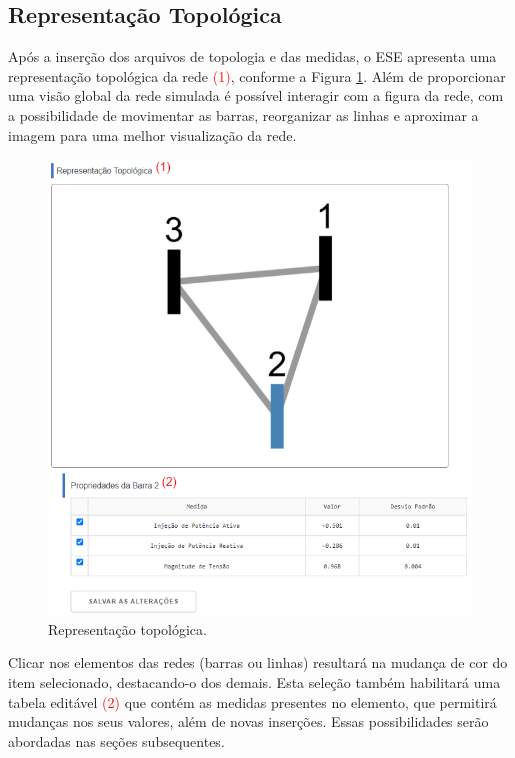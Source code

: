 \documentclass{article}
\begin{document}
\subsection{Representação Topológica}
Após a inserção dos arquivos de topologia e das medidas, o ESE apresenta uma representação topológica da rede \textcolor{red}{(1)}, conforme a Figura \ref{fig::topology}. Além de proporcionar uma visão global da rede simulada é possível interagir com a figura da rede, com a possibilidade de movimentar as barras, reorganizar as linhas e aproximar a imagem para uma melhor visualização da rede.  

\begin{figure}[H]
    \centering
    \includegraphics[scale = .5]{Imagens/Representação_Topologica.png}
    \caption{Representação topológica.}
    \label{fig::topology}
\end{figure}

Clicar nos elementos das redes (barras ou linhas) resultará na mudança de cor do item selecionado, destacando-o dos demais. Esta seleção também habilitará uma tabela editável \textcolor{red}{(2)} que contém as medidas presentes no elemento, que permitirá mudanças nos seus valores, além de novas inserções. Essas possibilidades serão abordadas nas seções subsequentes. 
\end{document}
